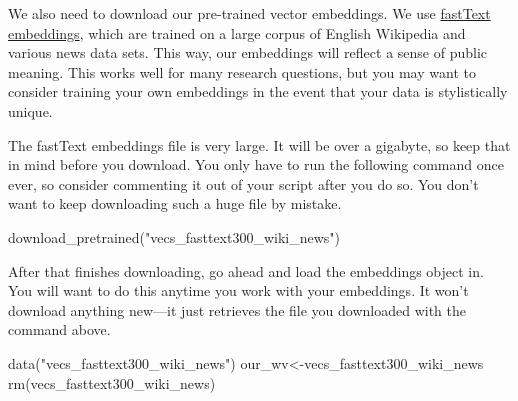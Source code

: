 \documentclass[
  letterpaper,
  DIV=11,
  numbers=noendperiod]{scrreprt}
\newenvironment{Shaded}{\begin{snugshade}}{\end{snugshade}}
\newcommand{\FunctionTok}[1]{\textcolor[rgb]{0.28,0.35,0.67}{#1}}
\newcommand{\NormalTok}[1]{\textcolor[rgb]{0.00,0.23,0.31}{#1}}
\newcommand{\OtherTok}[1]{\textcolor[rgb]{0.00,0.23,0.31}{#1}}
\newcommand{\StringTok}[1]{\textcolor[rgb]{0.13,0.47,0.30}{#1}}
\begin{document}
We also need to download our pre-trained vector embeddings. We use
\href{https://fasttext.cc/docs/en/english-vectors.html}{fastText
embeddings}, which are trained on a large corpus of English Wikipedia
and various news data sets. This way, our embeddings will reflect a
sense of public meaning. This works well for many research questions,
but you may want to consider training your own embeddings in the event
that your data is stylistically unique.

\begin{tcolorbox}[enhanced jigsaw, rightrule=.15mm, leftrule=.75mm, arc=.35mm, bottomrule=.15mm, title=\textcolor{quarto-callout-caution-color}{\faFire}\hspace{0.5em}{Caution}, colback=white, coltitle=black, left=2mm, toptitle=1mm, bottomtitle=1mm, colbacktitle=quarto-callout-caution-color!10!white, breakable, titlerule=0mm, colframe=quarto-callout-caution-color-frame, opacitybacktitle=0.6, toprule=.15mm, opacityback=0]

The fastText embeddings file is very large. It will be over a gigabyte,
so keep that in mind before you download. You only have to run the
following command once ever, so consider commenting it out of your
script after you do so. You don't want to keep downloading such a huge
file by mistake.

\end{tcolorbox}

\begin{Shaded}
\begin{Highlighting}[]
\FunctionTok{download\_pretrained}\NormalTok{(}\StringTok{"vecs\_fasttext300\_wiki\_news"}\NormalTok{)}
\end{Highlighting}
\end{Shaded}

After that finishes downloading, go ahead and load the embeddings object
in. You will want to do this anytime you work with your embeddings. It
won't download anything new---it just retrieves the file you downloaded
with the command above.

\begin{Shaded}
\begin{Highlighting}[]
\FunctionTok{data}\NormalTok{(}\StringTok{"vecs\_fasttext300\_wiki\_news"}\NormalTok{)}
\NormalTok{our\_wv}\OtherTok{\textless{}{-}}\NormalTok{vecs\_fasttext300\_wiki\_news}
\FunctionTok{rm}\NormalTok{(vecs\_fasttext300\_wiki\_news)}
\end{Highlighting}
\end{Shaded}
\end{document}
